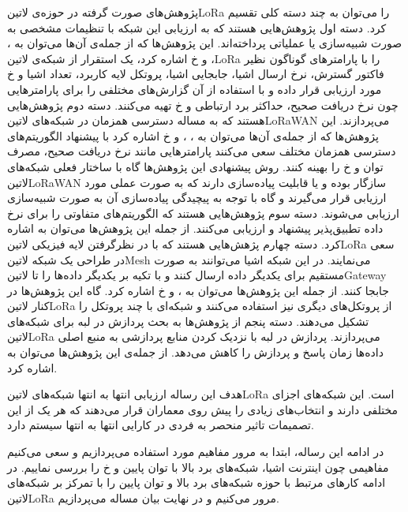 پژوهش‌های صورت گرفته در حوزه‌ی ‌لاتین{LoRa} را می‌توان به چند دسته کلی تقسیم کرد. دسته اول پژوهش‌هایی هستند که به ارزیابی این شبکه با تنظیمات مشخصی
به صورت شبیه‌سازی یا عملیاتی پرداخته‌اند. این پژوهش‌ها که از جمله‌ی آن‌ها می‌توان به ، ، 
و ‌خ اشاره کرد، یک استقرار از شبکه‌ی ‌لاتین{LoRa}
را با پارامترهای گوناگون نظیر فاکتور گسترش، نرخ ارسال اشیا، جابجایی اشیا، پروتکل لایه کاربرد، تعداد اشیا و ‌خ مورد ارزیابی قرار داده و با استفاده از آن گزارش‌های مختلفی را
برای پارامترهایی چون نرخ دریافت صحیح، حداکثر برد ارتباطی و ‌خ تهیه می‌کنند.
دسته دوم پژوهش‌هایی هستند که به مساله دسترسی همزمان در شبکه‌های ‌لاتین{LoRaWAN} می‌پردازند. این پژوهش‌ها که از جمله‌ی آن‌ها می‌توان به ، ،  و ‌خ
اشاره کرد با پیشنهاد الگوریتم‌های دسترسی همزمان مختلف سعی می‌کنند پارامترهایی مانند نرخ دریافت صحیح، مصرف توان و ‌خ را بهینه کنند. روش پیشنهادی این پژوهش‌ها گاه با ساختار فعلی
شبکه‌های ‌لاتین{LoRaWAN} سازگار بوده و یا قابلیت پیاده‌سازی دارند که به صورت عملی مورد ارزیابی قرار می‌گیرند و گاه با توجه به پیچیدگی پیاده‌سازی آن به صورت شبیه‌سازی ارزیابی می‌شوند.
دسته سوم پژوهش‌هایی هستند که الگوریتم‌های متفاوتی را برای نرخ داده تطبیق‌پذیر پیشنهاد و ارزیابی می‌کنند. از جمله این پژوهش‌ها می‌توان به  اشاره کرد.
دسته چهارم پژهش‌هایی هستند که با در نظرگرفتن لایه فیزیکی ‌لاتین{LoRa} سعی در طراحی یک شبکه ‌لاتین{Mesh} می‌نمایند. در این شبکه اشیا می‌توانند
به صورت مستقیم برای یکدیگر داده ارسال کنند و با تکیه بر یکدیگر داده‌ها را تا ‌لاتین{Gateway} جابجا کنند. از جمله این پژوهش‌ها می‌توان به ،  و ‌خ اشاره کرد.
گاه این پژوهش‌ها در کنار ‌لاتین{LoRa} از پروتکل‌های دیگری نیز استفاده می‌کنند و شبکه‌ای با چند پروتکل را تشکیل می‌دهند.
دسته پنجم از پژوهش‌ها به بحث پردازش در لبه برای شبکه‌های ‌لاتین{LoRa} می‌پردازند. پردازش در لبه با نزدیک کردن منابع پردازشی به منبع اصلی داده‌ها زمان پاسخ و پردازش را کاهش می‌دهد.
از جمله‌ی این پژوهش‌ها می‌توان به  اشاره کرد.

هدف این رساله ارزیابی انتها به انتها شبکه‌های ‌لاتین{LoRa} است. این شبکه‌های اجزای مختلفی دارند و انتخاب‌های زیادی را پیش روی معماران قرار می‌دهند که هر یک از این تصمیمات
تاثیر منحصر به فردی در کارایی انتها به انتها سیستم دارد.

در ادامه این رساله، ابتدا به مرور مفاهیم مورد استفاده می‌پردازیم و سعی می‌کنیم مفاهیمی چون اینترنت اشیا، شبکه‌های برد بالا با توان پایین و ‌خ را بررسی نماییم. در ادامه
کارهای مرتبط با حوزه شبکه‌های برد بالا و توان پایین را با تمرکز بر شبکه‌های ‌لاتین{LoRa} مرور می‌کنیم و در نهایت بیان مساله می‌پردازیم.
